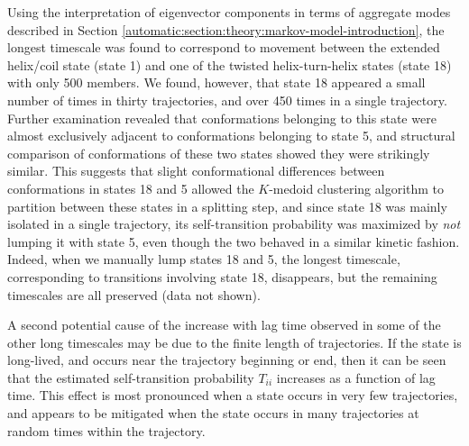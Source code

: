 Using the interpretation of eigenvector components in terms of aggregate modes described in Section \ref{automatic:section:theory:markov-model-introduction}, the longest timescale was found to correspond to movement between the extended helix/coil state (state 1) and one of the twisted helix-turn-helix states (state 18) with only 500 members.  
We found, however, that state 18 appeared a small number of times in thirty trajectories, and over 450 times in a single trajectory.
Further examination revealed that conformations belonging to this state were almost exclusively adjacent to conformations belonging to state 5, and structural comparison of conformations of these two states showed they were strikingly similar.
This suggests that slight conformational differences between conformations in states 18 and 5 allowed the $K$-medoid clustering algorithm to partition between these states in a splitting step, and since state 18 was mainly isolated in a single trajectory, its self-transition probability was maximized by \emph{not} lumping it with state 5, even though the two behaved in a similar kinetic fashion.
Indeed, when we manually lump states 18 and 5, the longest timescale, corresponding to transitions involving state 18, disappears, but the remaining timescales are all preserved (data not shown).

A second potential cause of the increase with lag time observed 
in some of the other long timescales
may be due to the finite length of trajectories.
If the state is long-lived, and occurs near the trajectory beginning or end, then it can be seen that the estimated self-transition probability $T_{ii}$ increases as a function of lag time.
This effect is most pronounced when a state occurs in very few trajectories, and appears to be mitigated when the state occurs in many trajectories at random times within the trajectory.
          
